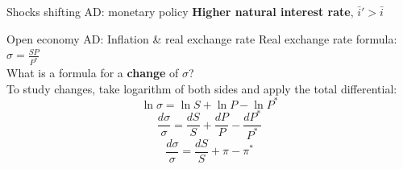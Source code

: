 \documentclass{beamer}
\begin{document}
\begin{frame}{Shocks shifting AD: monetary policy}
  \vspace{-3cm}
 \small \textbf{Higher natural interest rate}, $\bar{i}'> \bar{i}$
 \vfill
\end{frame}


\begin{frame}{Open economy AD: Inflation \& real exchange rate}
Real exchange rate formula: $\sigma = \frac{S P}{P^*}$ \\
\vfill
What is a formula for a \textbf{change} of $\sigma$? \\
\vfill
To study changes, take logarithm of both sides and apply the total differential: 
$$\ln \sigma = \ln S + \ln P - \ln P^*$$
$$\frac{d \sigma}{\sigma} = \frac{d S}{S} + \frac{d P}{P}  - \frac{d P^*}{P^*} $$
$$\frac{d \sigma}{\sigma} = \frac{d S}{S} + \pi  - \pi^* $$
  
  
\end{frame}
\end{document}
